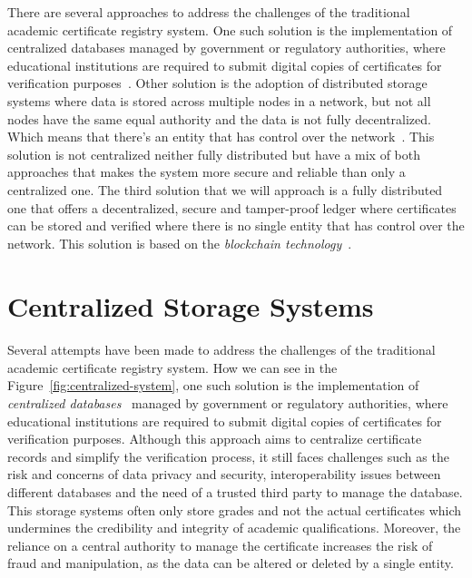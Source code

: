 There are several approaches to address the challenges of the traditional academic certificate registry system. One such solution is the implementation of centralized databases managed by government or regulatory authorities,
where educational institutions are required to submit digital copies of certificates for verification purposes~\cite{LinWays}.
Other solution is the adoption of distributed storage systems where data is stored across multiple nodes in a network, but not all nodes have the same equal authority and the data is not fully decentralized. Which means that there's an entity that has control over the network~\cite{sharples2016blockchain}.
This solution is not centralized neither fully distributed but have a mix of both approaches that makes the system more secure and reliable than only a centralized one.
The third solution that we will approach is a fully distributed one that offers a decentralized, secure and tamper-proof ledger where certificates can be stored and verified where
there is no single entity that has control over the network. This solution is based on the \textit{blockchain technology}~\cite{app14020706, saleh2020blockchain}.

\section{Centralized Storage Systems}\label{sec:centralized-systems}
\paragraph{}

Several attempts have been made to address the challenges of the traditional academic certificate registry system.
How we can see in the Figure~\ref{fig:centralized-system}, one such solution is the implementation of \textit{centralized databases}~\cite{OLSON200971} managed by government or regulatory authorities, where educational institutions are required to
submit digital copies of certificates for verification purposes. Although this approach aims to centralize certificate records and simplify the verification process, it still faces challenges
such as the risk and concerns of data privacy and security, interoperability issues between different databases and the need of a trusted third party to manage the database.
This storage systems often only store grades and not the actual certificates which undermines the credibility and integrity of academic qualifications.
Moreover, the reliance on a central authority to manage the certificate increases the risk of fraud and manipulation, as the data can be altered or deleted by a single entity.

